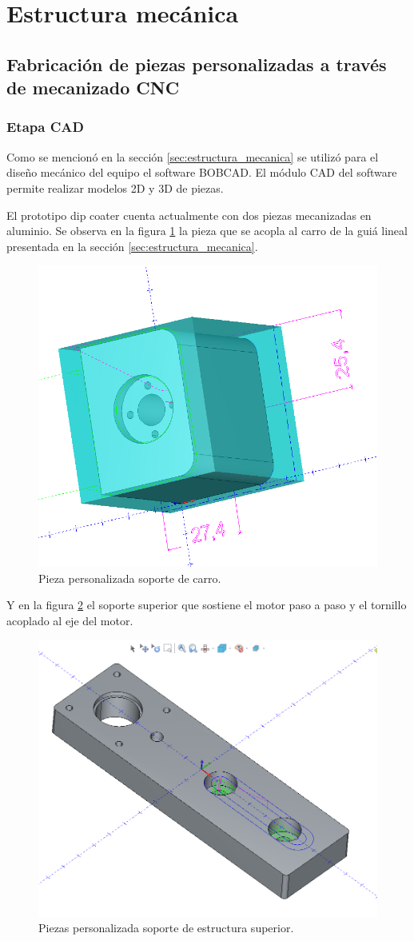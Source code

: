 
\section{Estructura mecánica}
\subsection{Fabricación de piezas personalizadas a través de mecanizado CNC}

\subsubsection{Etapa CAD}

Como se mencionó en la sección \ref{sec:estructura_mecanica} se utilizó para el diseño mecánico del equipo el software BOBCAD. El módulo CAD del software permite realizar modelos 2D y 3D de piezas.

El prototipo dip coater cuenta actualmente con dos piezas mecanizadas en aluminio. Se observa en la figura \ref{fig:carro} la pieza que se acopla al carro de la guiá lineal presentada en la sección \ref{sec:estructura_mecanica}.

\begin{figure}[ht]
	\centering
	\includegraphics[width=.5\textwidth]{./Figures/3d_carro.png}
	\caption{Pieza personalizada soporte de carro.}
	\label{fig:carro}
\end{figure}

Y en la figura \ref{fig:estructura_superior} el soporte superior que sostiene el motor paso a paso y el  tornillo acoplado al eje del motor.

\begin{figure}[h]
	\centering
	\includegraphics[width=.5\textwidth]{./Figures/3d_top.png}
	\caption{Piezas personalizada soporte de estructura superior.}
	\label{fig:estructura_superior}
\end{figure}

